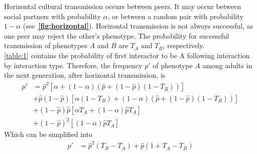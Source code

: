\documentclass[12pt]{extarticle}
\begin{document}
Horizontal cultural transmission occurs between peers. 
It may occur between social partners with probability $\alpha$, or between a random pair with probability $1-\alpha$ (see~\textbf{\autoref{fig:horizontal}}).
Horizontal transmission is not always successful, as one peer may reject the other's phenotype. The probability for successful transmission of phenotypes $A$ and $B$ are $T_A$ and $T_B$, respectively.\\
\autoref{table:1} contains the probability of first interactor to be A following interaction by interaction type.
Therefore, the frequency $p'$ of phenotype $A$ among adults in the next generation, after horizontal transmission, is 
\begin{equation}\label{eq:nextgen_adults}
\begin{aligned}
p'
& = \hat{p}^2 [\alpha + (1-\alpha)(\hat{p} + (1-\hat{p})(1-T_B))] \\
& + \hat{p}(1-\hat{p}) [\alpha(1-T_B) + (1-\alpha)(\hat{p} + (1-\hat{p})(1-T_B))] \\
& + (1-\hat{p})\hat{p} [\alpha T_A + (1-\alpha) \hat{p} T_A ] \\
& + (1-\hat{p})^2 [(1-\alpha) \hat{p} T_A]
\end{aligned}
\end{equation}
Which can be simplified into
\begin{equation}\label{eq:nextgen_adults_slimpify}
  \begin{aligned}
  p'  & = \hat{p}^2(T_B-T_A) + \hat{p}(1+T_A-T_B) \\
  \end{aligned}
  \end{equation}
\end{document}
